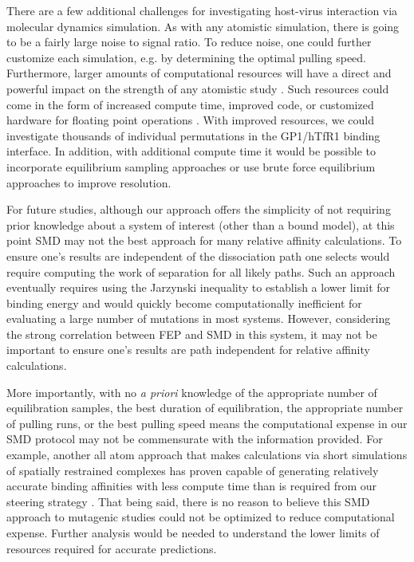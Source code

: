 \documentclass[12pt]{article}
\begin{document}
There are a few additional challenges for investigating host-virus interaction via molecular dynamics simulation. As with any atomistic simulation, there is going to be a fairly large noise to signal ratio. To reduce noise, one could further customize each simulation, e.g. by determining the optimal pulling speed. Furthermore, larger amounts of computational resources will have a direct and powerful impact on the strength of any atomistic study \citep{Shaw2012}. Such resources could come in the form of increased compute time, improved code, or customized hardware for floating point operations \citep{Shaw2011}. With improved resources, we could investigate thousands of individual permutations in the GP1/hTfR1 binding interface. In addition, with additional compute time it would be possible to incorporate equilibrium sampling approaches \citep{Buch2011} or use brute force equilibrium approaches \citep{Giorgino2012} to improve resolution. 

For future studies, although our approach offers the simplicity of not requiring prior knowledge about a system of interest (other than a bound model), at this point SMD may not the best approach for many relative affinity calculations. To ensure one's results are independent of the dissociation path one selects would require computing the work of separation for all likely paths. Such an approach eventually requires using the Jarzynski inequality \citep{Jar1997} to establish a lower limit for binding energy and would quickly become computationally inefficient for evaluating a large number of mutations in most systems. However, considering the strong correlation between FEP and SMD in this system, it may not be important to ensure one's results are path independent for relative affinity calculations. 

More importantly, with no \textit{a priori} knowledge of the appropriate number of equilibration samples, the best duration of equilibration, the appropriate number of pulling runs, or the best pulling speed means the computational expense in our SMD protocol may not be commensurate with the information provided. For example, another all atom approach that makes calculations via short simulations of spatially restrained complexes has proven capable of generating relatively accurate binding affinities with less compute time than is required from our steering strategy \citep{Gumbart2013,Gumbart2013b}. That being said, there is no reason to believe this SMD approach to mutagenic studies could not be optimized to reduce computational expense. Further analysis would be needed to understand the lower limits of resources required for accurate predictions.
\end{document}
